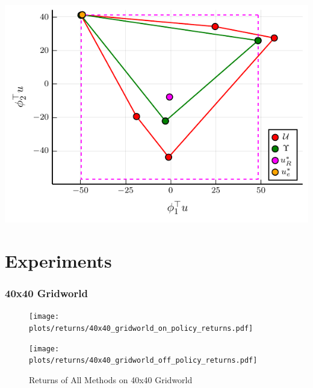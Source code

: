 \documentclass{beamer}
\begin{document}
\begin{frame}
	\begin{center}
		\includegraphics[width=\textwidth, height=\textheight]{../../pres_roil/plots/visual_solve_cheb.pdf}
	\end{center}
\end{frame}

\section*{Experiments}


\begin{frame}
\frametitle{40x40 Gridworld}

\begin{figure}
  \begin{center}
  \begin{minipage}{0.45\linewidth}
    \centering
    \texttt{[image: plots/returns/40x40\_gridworld\_on\_policy\_returns.pdf]}
  \end{minipage}
  \hspace{0.05\linewidth}
  \begin{minipage}{0.45\linewidth}
    \centering
    \texttt{[image: plots/returns/40x40\_gridworld\_off\_policy\_returns.pdf]}
  \end{minipage}
  \end{center}
\caption{Returns of All Methods on 40x40 Gridworld}
\end{figure}
\end{frame}
\end{document}

